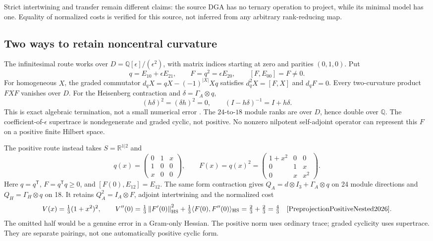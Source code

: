 \documentclass[11pt,a4paper]{article}
\newcommand{\HS}{\mathrm{HS}}
\begin{document}
Strict intertwining and transfer remain different claims: the source
DGA has no ternary operation to project, while its minimal model has
one. Equality of normalized costs is verified for this source, not
inferred from any arbitrary rank-reducing map.

\subsection{Two ways to retain noncentral curvature}
\label{sec:noncentral-nested}
The infinitesimal route works over
\(D=\mathbb Q[\epsilon]/(\epsilon^2)\), with matrix indices starting at
zero and parities \((0,1,0)\). Put
\[
 q=E_{10}+\epsilon E_{21},\qquad
 F=q^2=\epsilon E_{20},\qquad [F,E_{00}]=F\ne0.
\]
For homogeneous \(X\), the graded commutator
\(d_qX=qX-(-1)^{|X|}Xq\) satisfies \(d_q^2X=[F,X]\) and \(d_qF=0\).
Every two-curvature product \(FXF\) vanishes over \(D\).
For the Heisenberg contraction and \(\delta=\Gamma_A\otimes q\),
\[
 (h\delta)^2=(\delta h)^2=0,\qquad
 (I-h\delta)^{-1}=I+h\delta.
\]
This is exact algebraic termination, not a small numerical error
\cite{PreprojectionNoncentralTransfer2026}. The \(24\)-to-\(18\) module
ranks are over \(D\), hence double over \(\mathbb Q\).
The coefficient-of-\(\epsilon\) supertrace is nondegenerate and graded
cyclic, not positive. No nonzero nilpotent self-adjoint operator can
represent this \(F\) on a positive finite Hilbert space.

The positive route instead takes \(S=\mathbb R^{1|2}\) and
\[
 q(x)=\begin{pmatrix}0&1&x\\1&0&0\\x&0&0\end{pmatrix},\qquad
 F(x)=q(x)^2=
 \begin{pmatrix}1+x^2&0&0\\0&1&x\\0&x&x^2\end{pmatrix}.
\]
Here \(q=q^{\mathsf T}\), \(F=q^{\mathsf T}q\geq0\), and
\([F(0),E_{12}]=E_{12}\). The same form contraction gives
\(Q_A=d\otimes I_3+\Gamma_A\otimes q\) on 24 module directions and
\(Q_H=\Gamma_H\otimes q\) on 18. It retains
\(Q_A^2=I_A\otimes F\), adjoint intertwining and the normalized cost
\[
 V(x)=\tfrac13(1+x^2)^2,\qquad
 V''(0)=\tfrac13\norm{F'(0)}_{\HS}^2+
         \tfrac13\langle F(0),F''(0)\rangle_{\HS}
       =\tfrac23+\tfrac23=\tfrac43
 \quad\cite{PreprojectionPositiveNested2026}.
\]
The omitted half would be a genuine error in a Gram-only Hessian.
The positive norm uses ordinary trace; graded cyclicity uses supertrace.
They are separate pairings, not one automatically positive cyclic form.
\end{document}
